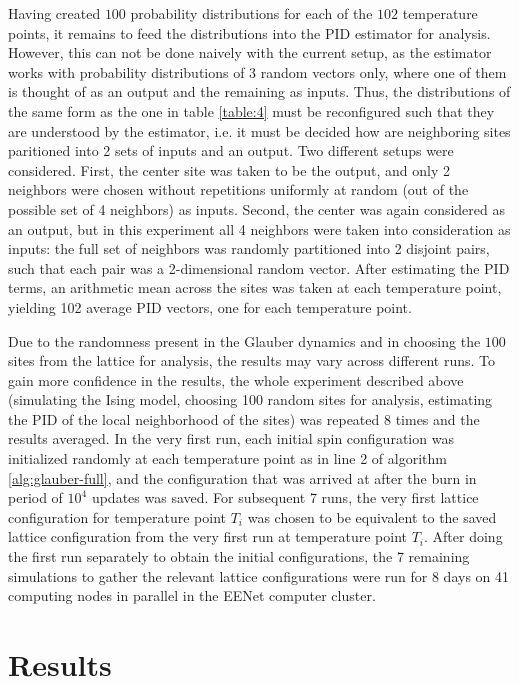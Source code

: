 \documentclass[12pt]{article}
\begin{document}
Having created $100$ probability distributions for each of the $102$ temperature points, it remains to feed the distributions into the PID estimator for analysis. However, this can not be done naively with the current setup, as the estimator works with probability distributions of 3 random vectors only, where one of them is thought of as an output and the remaining as inputs. Thus, the distributions of the same form as the one in table \ref{table:4} must be reconfigured such that they are understood by the estimator, i.e. it must be decided how are neighboring sites paritioned into 2 sets of inputs and an output. Two different setups were considered. First, the center site was taken to be the output, and only 2 neighbors were chosen without repetitions uniformly at random (out of the possible set of 4 neighbors) as inputs. Second, the center was again considered as an output, but in this experiment all 4 neighbors were taken into consideration as inputs: the full set of neighbors was randomly partitioned into 2 disjoint pairs, such that each pair was a 2-dimensional random vector. After estimating the PID terms, an arithmetic mean across the sites was taken at each temperature point, yielding 102 average PID vectors, one for each temperature point. 

Due to the randomness present in the Glauber dynamics and in choosing the $100$ sites from the lattice for analysis, the results may vary across different runs. To gain more confidence in the results, the whole experiment described above (simulating the Ising model, choosing 100 random sites for analysis, estimating the PID of the local neighborhood of the sites) was repeated 8 times and the results averaged. In the very first run, each initial spin configuration was initialized randomly at each temperature point as in line 2 of algorithm \ref{alg:glauber-full}, and the configuration that was arrived at after the burn in period of $10^4$ updates was saved. For subsequent 7 runs, the very first lattice configuration for temperature point $T_i$ was chosen to be equivalent to the saved lattice configuration from the very first run at temperature point $T_i$. After doing the first run separately to obtain the initial configurations, the 7 remaining simulations to gather the relevant lattice configurations were run for 8 days on 41 computing nodes in parallel in the EENet computer cluster.

\newpage
\section{Results}
\end{document}
